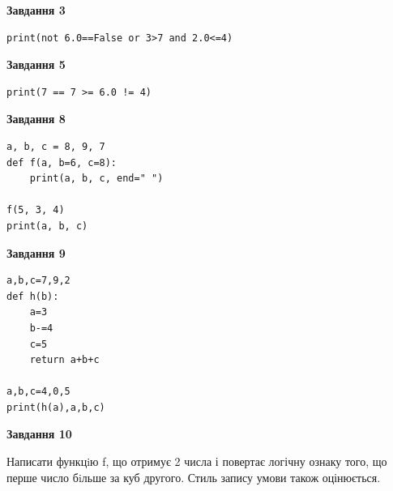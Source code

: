 \documentclass[12pt, ukrainian]{article}
\begin{document}
{\begin {large}
\begin{minipage}[t]{7.5cm}
\end{minipage}
\vline \hspace{6mm}
\begin{minipage}[t]{10.5cm}

\begin{center}
\textbf{Завдання 3}
\end{center}

\begin{verbatim}
print(not 6.0==False or 3>7 and 2.0<=4)
\end{verbatim}



\begin{center}
\textbf{Завдання 5}
\end{center}

\begin{verbatim}
print(7 == 7 >= 6.0 != 4)
\end{verbatim}



\begin{center}
\textbf{Завдання 8}
\end{center}

\begin{verbatim}
a, b, c = 8, 9, 7
def f(a, b=6, c=8):
    print(a, b, c, end=" ")

f(5, 3, 4)
print(a, b, c)
\end{verbatim}



\begin{center}
\textbf{Завдання 9}
\end{center}

\begin{verbatim}
a,b,c=7,9,2
def h(b):
    a=3
    b-=4
    c=5
    return a+b+c

a,b,c=4,0,5
print(h(a),a,b,c)
\end{verbatim}



\begin{center}
\textbf{Завдання 10}
\end{center}

Написати функцiю f, що отримує 2 числа і повертає логічну ознаку того, що перше число бiльше за куб другого. Стиль запису умови також оцінюється.\par

\end{minipage}

\end {large}}
\newpage
\end{document}
